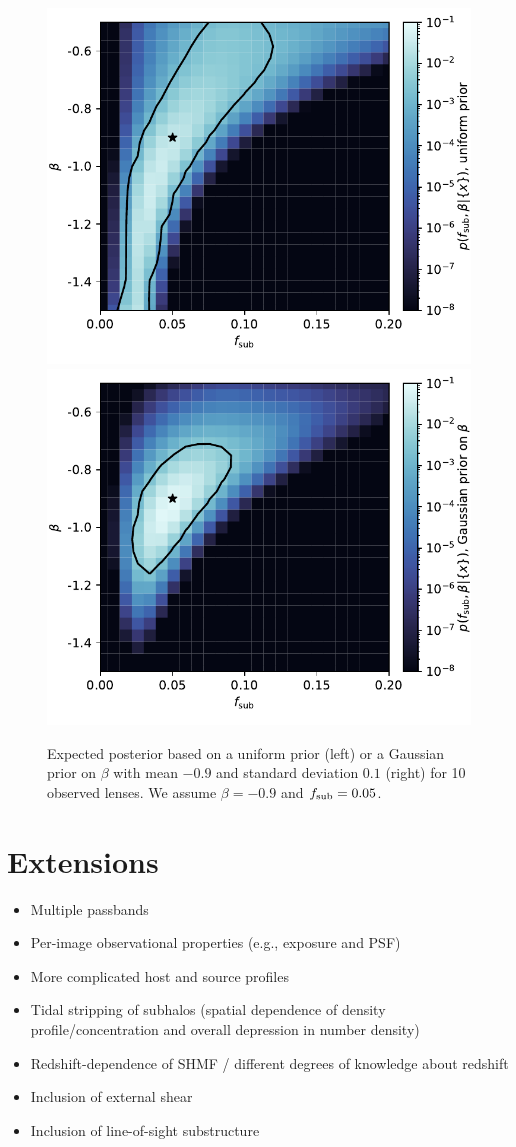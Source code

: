\documentclass[twocolumn]{aastex62}
\begin{document}
\begin{figure}
\centering
\includegraphics[height=0.4\textwidth]{figures/posterior_uniform}
\includegraphics[height=0.4\textwidth]{figures/posterior_narrow}
\caption{Expected posterior based on a uniform prior (left) or a Gaussian prior on $\beta$ with mean $-0.9$ and standard deviation $0.1$ (right) for 10 observed lenses. We assume $\beta = -0.9$ and $f_{\mathrm{sub}} = 0.05$. }
\label{fig:expected_likelihood}
\end{figure}


\section{Extensions}
\label{sec:extensions}

\begin{itemize}
\item Multiple passbands
\item Per-image observational properties (e.g., exposure and PSF)
\item More complicated host and source profiles
\item Tidal stripping of subhalos (spatial dependence of density profile/concentration and overall depression in number density)
\item Redshift-dependence of SHMF / different degrees of knowledge about redshift
\item Inclusion of external shear
\item Inclusion of line-of-sight substructure
\end{itemize}
\end{document}
